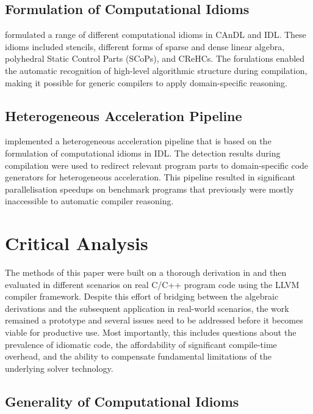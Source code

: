 \subsection*{Formulation of Computational Idioms}

     formulated a range of
    different computational idioms in CAnDL and IDL.
    These idioms included stencils, different forms of sparse and dense linear
    algebra, polyhedral Static Control Parts (SCoPs), and CReHCs.
    The forulations enabled the automatic recognition of high-level algorithmic
    structure during compilation, making it possible for generic compilers to
    apply domain-specific reasoning.

\subsection*{Heterogeneous Acceleration Pipeline}

     implemented a heterogeneous acceleration pipeline that
    is based on the formulation of computational idioms in IDL.
    The detection results during compilation were used to redirect relevant
    program parts to domain-specific code generators for heterogeneous
    acceleration.
    This pipeline resulted in significant parallelisation speedups on benchmark
    programs that previously were mostly inaccessible to automatic compiler
    reasoning.

\section{Critical Analysis}

    The methods of this paper were built on a thorough derivation in
     and then evaluated in different scenarios on real
    C/C++ program code using the LLVM compiler framework.
    Despite this effort of bridging between the algebraic derivations and the
    subsequent application in real-world scenarios, the work remained a
    prototype and several issues need to be addressed before it becomes viable
    for productive use.
    Most importantly, this includes questions about the prevalence of idiomatic
    code, the affordability of significant compile-time overhead, and the
    ability to compensate fundamental limitations of the underlying solver
    technology.

\subsection*{Generality of Computational Idioms}  

